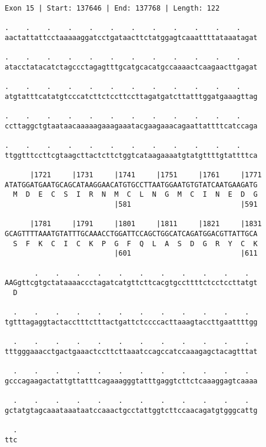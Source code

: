 \documentclass{article}
\begin{document}
\begin{Verbatim}
Exon 15 | Start: 137646 | End: 137768 | Length: 122
 
.    .    .    .    .    .    .    .    .    .    .    .    
aactattattcctaaaaaggatcctgataacttctatggagtcaaattttataaatagat
  
.    .    .    .    .    .    .    .    .    .    .    .    
atacctatacatctagccctagagtttgcatgcacatgccaaaactcaagaacttgagat
  
.    .    .    .    .    .    .    .    .    .    .    .    
atgtatttcatatgtcccatcttctccttccttagatgatcttatttggatgaaagttag
  
.    .    .    .    .    .    .    .    .    .    .    .    
ccttaggctgtaataacaaaaagaaagaaatacgaagaaacagaattattttcatccaga
  
.    .    .    .    .    .    .    .    .    .    .    .    
ttggtttccttcgtaagcttactcttctggtcataagaaaatgtatgttttgtattttca
  
      |1721     |1731     |1741     |1751     |1761     |1771
ATATGGATGAATGCAGCATAAGGAACATGTGCCTTAATGGAATGTGTATCAATGAAGATG
  M  D  E  C  S  I  R  N  M  C  L  N  G  M  C  I  N  E  D  G
                          |581                          |591
  
      |1781     |1791     |1801     |1811     |1821     |1831
GCAGTTTTAAATGTATTTGCAAACCTGGATTCCAGCTGGCATCAGATGGACGTTATTGCA
  S  F  K  C  I  C  K  P  G  F  Q  L  A  S  D  G  R  Y  C  K
                          |601                          |611
  
       .    .    .    .    .    .    .    .    .    .    .  
AAGgttcgtgctataaaaccctagatcatgttcttcacgtgccttttctcctccttatgt
  D                                                         
  
  .    .    .    .    .    .    .    .    .    .    .    .  
tgtttagaggtactacctttctttactgattctccccacttaaagtaccttgaattttgg
  
  .    .    .    .    .    .    .    .    .    .    .    .  
tttgggaaacctgactgaaactccttcttaaatccagccatccaaagagctacagtttat
  
  .    .    .    .    .    .    .    .    .    .    .    .  
gcccagaagactattgttatttcagaaagggtatttgaggtcttctcaaaggagtcaaaa
  
  .    .    .    .    .    .    .    .    .    .    .    .  
gctatgtagcaaataaataatccaaactgcctattggtcttccaacagatgtgggcattg
  
  .
ttc
\end{Verbatim}
\newpage
\end{document}
